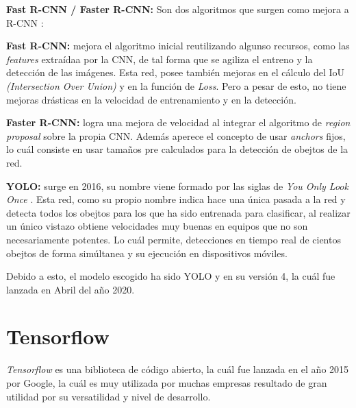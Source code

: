 \begin{list}{\textbullet}{ %
    \addtolength{\itemsep}{-2mm} %
    \setlength{\itemindent}{2mm}}

    \item \textbf{Fast R-CNN / Faster R-CNN:} Son dos algoritmos que surgen como mejora a R-CNN \cite{faster_rcnn}:
    \begin{list}{\textbullet}{ %
        \addtolength{\itemsep}{-2mm} %
        \setlength{\itemindent}{2mm}}
        \item \textbf{Fast R-CNN:} mejora el algoritmo inicial reutilizando algunso recursos, como las \textit{features} extraídaa por la CNN, de tal forma que se agiliza el entreno y la detección de las imágenes.
        Esta red, posee también mejoras en el cálculo del IoU \textit{(Intersection Over Union)} y en la función de \textit{Loss}. Pero a pesar de esto, no tiene mejoras drásticas en la velocidad de entrenamiento y en la detección.
        \clearpage
       \item \textbf{Faster R-CNN:} logra una mejora de velocidad al integrar el algoritmo de \textit{region proposal} \cite{region_proposal} sobre la propia CNN.
       Además aperece el concepto de usar \textit{anchors} fijos, lo cuál consiste en usar tamaños pre calculados para la detección de obejtos de la red.
    \end{list}

    \item \textbf{YOLO:} surge en 2016, su nombre viene formado por las siglas de \textit{You Only Look Once} \cite{yolov4}.
    Esta red, como su propio nombre indica hace una única pasada a la red y detecta todos los obejtos para los que ha sido entrenada para clasificar, al realizar un único vistazo obtiene velocidades muy buenas en equipos que no son necesariamente potentes. Lo cuál permite, detecciones en tiempo real de cientos obejtos de forma simúltanea y su ejecución en dispositivos móviles.  
\end{list}
Debido a esto, el modelo escogido ha sido YOLO y en su versión 4, la cuál fue lanzada en Abril del año 2020.


\section{Tensorflow}
\textit{Tensorflow} \cite{tensorflow} es una biblioteca de código abierto, la cuál fue lanzada en el año 2015 por Google, la cuál es muy utilizada por muchas empresas resultado de gran utilidad por su versatilidad y nivel de desarrollo.


